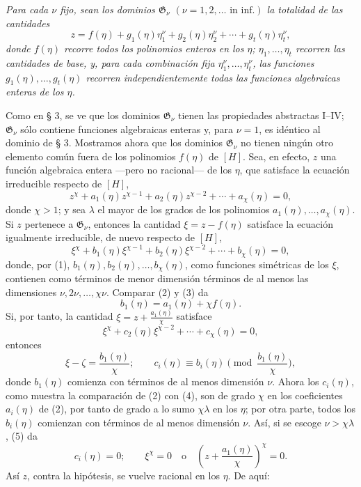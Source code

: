 \documentclass[11pt]{article}
\begin{document}
\emph{Para cada $\nu$ fijo, sean los dominios $\mathfrak G_\nu$ $(\nu=1,2,\ldots\text{ in inf.})$ la totalidad de las cantidades}
\begin{equation}
z=f(\eta)+g_1(\eta)\eta_1^\nu+g_2(\eta)\eta_2^\nu+\cdots+g_t(\eta)\eta_t^\nu,
\tag{1}
\end{equation}
\emph{donde $f(\eta)$ recorre todos los polinomios enteros en los $\eta$; $\eta_1,\ldots,\eta_t$ recorren las cantidades de base, y, para cada combinación fija $\eta_1^\nu,\ldots,\eta_t^\nu$, las funciones $g_1(\eta),\ldots,g_t(\eta)$ recorren independientemente todas las funciones algebraicas enteras de los $\eta$.}

Como en § 3, se ve que los dominios $\mathfrak G_\nu$ tienen las propiedades abstractas I--IV; $\mathfrak G_\nu$ sólo contiene funciones algebraicas enteras y, para $\nu=1$, es idéntico al dominio de § 3. Mostramos ahora que los dominios $\mathfrak G_\nu$ no tienen ningún otro elemento común fuera de los polinomios $f(\eta)$ de $[H]$. Sea, en efecto, $z$ una función algebraica entera ---pero no racional--- de los $\eta$, que satisface la ecuación irreducible respecto de $[H]$,
\begin{equation}
z^\chi+a_1(\eta)z^{\chi-1}+a_2(\eta)z^{\chi-2}+\cdots+a_\chi(\eta)=0,
\tag{2}
\end{equation}
donde $\chi>1$; y sea $\lambda$ el mayor de los grados de los polinomios $a_1(\eta),\ldots,a_\chi(\eta)$. Si $z$ pertenece a $\mathfrak G_\nu$, entonces la cantidad $\xi=z-f(\eta)$ satisface la ecuación igualmente irreducible, de nuevo respecto de $[H]$,
\begin{equation}
\xi^\chi+b_1(\eta)\xi^{\chi-1}+b_2(\eta)\xi^{\chi-2}+\cdots+b_\chi(\eta)=0,
\tag{3}
\end{equation}
donde, por (1), $b_1(\eta),b_2(\eta),\ldots,b_\chi(\eta)$, como funciones simétricas de los $\xi$, contienen como términos de menor dimensión términos de al menos las dimensiones $\nu,2\nu,\ldots,\chi\nu$. Comparar (2) y (3) da
\[
 b_1(\eta)=a_1(\eta)+\chi f(\eta).
\]
Si, por tanto, la cantidad $\xi=z+\frac{a_1(\eta)}{\chi}$ satisface
\begin{equation}
\xi^\chi+c_2(\eta)\xi^{\chi-2}+\cdots+c_\chi(\eta)=0,
\tag{4}
\end{equation}
entonces
\begin{equation}
 \xi-\zeta=\frac{b_1(\eta)}{\chi};
 \qquad
 c_i(\eta)\equiv b_i(\eta)\pmod{\frac{b_1(\eta)}{\chi}},
\tag{5}
\end{equation}
donde $b_1(\eta)$ comienza con términos de al menos dimensión $\nu$. Ahora los $c_i(\eta)$, como muestra la comparación de (2) con (4), son de grado $\chi$ en los coeficientes $a_i(\eta)$ de (2), por tanto de grado a lo sumo $\chi\lambda$ en los $\eta$; por otra parte, todos los $b_i(\eta)$ comienzan con términos de al menos dimensión $\nu$. Así, si se escoge $\nu>\chi\lambda$, (5) da
\[
 c_i(\eta)=0;\qquad
 \xi^\chi=0\quad\text{o}\quad
 \left(z+\frac{a_1(\eta)}{\chi}\right)^\chi=0.
\]
Así $z$, contra la hipótesis, se vuelve racional en los $\eta$. De aquí:
\end{document}
